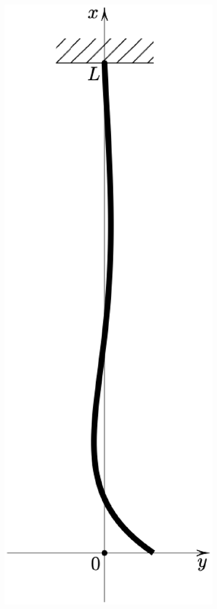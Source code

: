 \begin{figure}[H]
    \includegraphics[scale=0.4]{Imagenes/Cadena_Oscilante_05_png.eps}
\end{figure}

